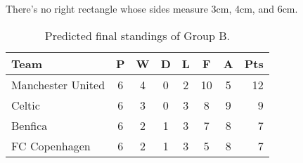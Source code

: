\begin{corollary}
  There's no right rectangle whose sides measure 3cm, 4cm, and 6cm.
\end{corollary}


\begin{table}
  \centering
  \caption{Predicted final standings of Group B.}
  \begin{tabular}{l*{6}{c}r}
    Team              & P & W & D & L & F  & A & Pts \\
    \hline
    Manchester United & 6 & 4 & 0 & 2 & 10 & 5 & 12  \\
    Celtic            & 6 & 3 & 0 & 3 &  8 & 9 &  9  \\
    Benfica           & 6 & 2 & 1 & 3 &  7 & 8 &  7  \\
    FC Copenhagen     & 6 & 2 & 1 & 3 &  5 & 8 &  7  \\
  \end{tabular}
  \label{tab-forecast}
\end{table}

\lipsum[5-7]